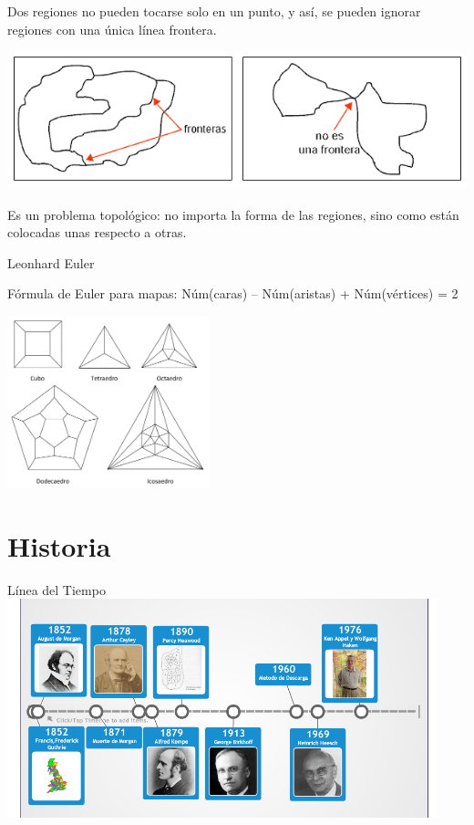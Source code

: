 \documentclass[spanish,utf8]{beamer}
\begin{document}
\begin{frame}{\insertsection}
\begin{block}{}
Dos regiones no pueden tocarse solo en un punto, y así, se pueden ignorar regiones con una única línea frontera.
\end{block}
\begin{center}
\includegraphics[scale=0.3]{fronteras.png}
\end{center}

\begin{block}{}
Es un problema topológico: no importa la forma de las regiones, sino como están colocadas unas respecto a otras.
\end{block}
\end{frame}


\begin{frame}{\insertsection}
Leonhard Euler
\begin{block}{Fórmula de Euler para mapas:}
Núm(caras) – Núm(aristas) + Núm(vértices) = 2
\end{block}
\begin{center}
   \includegraphics[height=5cm]{poliedros2.jpg}
\end{center}
\end{frame}
\section{Historia}

\begin{frame}{\insertsection}
Línea del Tiempo
\centering
\includegraphics[width=12.5cm]{linea.png}    
\end{frame}
\end{document}
